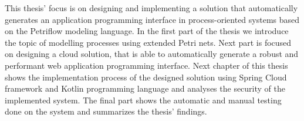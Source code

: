 This thesis' focus is on designing and implementing a solution that automatically generates an application programming interface in process-oriented systems based on the Petriflow modeling language. 
In the first part of the thesis we introduce the topic of modelling processes using extended Petri nets. Next part is focused on designing a cloud solution, that is able to automatically generate a robust and performant web application programming interface. Next chapter of this thesis shows the implementation process of the designed solution using Spring Cloud framework and Kotlin programming language and analyses the security of the implemented system. 
The final part shows the automatic and manual testing done on the system and summarizes the thesis' findings. 